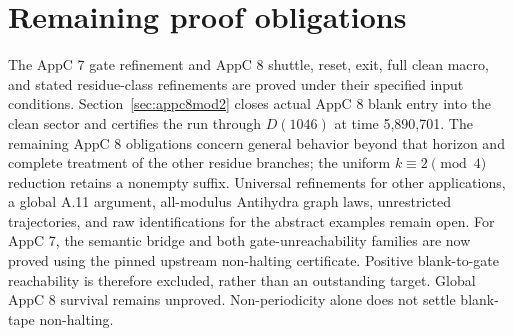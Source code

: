\documentclass[11pt]{article}
\DeclareRobustCommand{\_}{\ifmmode\sb\else\textunderscore\allowbreak\fi}
\theoremstyle{definition}
\theoremstyle{remark}
\begin{document}
\section{Remaining proof obligations}
\label{sec:limits}
The AppC 7 gate refinement and AppC 8 shuttle, reset, exit, full clean macro, and stated residue-class refinements are proved under their specified input conditions. Section~\ref{sec:appc8mod2} closes actual AppC 8 blank entry into the clean sector and certifies the run through $D(1046)$ at time 5,890,701. The remaining AppC 8 obligations concern general behavior beyond that horizon and complete treatment of the other residue branches; the uniform $k\equiv2\pmod4$ reduction retains a nonempty suffix. Universal refinements for other applications, a global A.11 argument, all-modulus Antihydra graph laws, unrestricted trajectories, and raw identifications for the abstract examples remain open. For AppC 7, the semantic bridge and both gate-unreachability families are now proved using the pinned upstream non-halting certificate. Positive blank-to-gate reachability is therefore excluded, rather than an outstanding target. Global AppC 8 survival remains unproved. Non-periodicity alone does not settle blank-tape non-halting.

\par\bigskip


\end{document}
